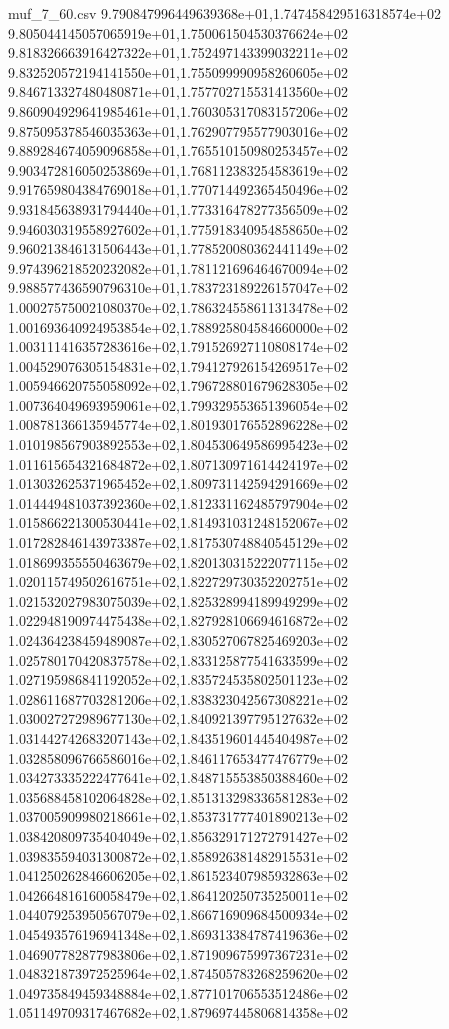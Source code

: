 \begin{filecontents*}{muf_7_60.csv}
9.790847996449639368e+01,1.747458429516318574e+02
9.805044145057065919e+01,1.750061504530376624e+02
9.818326663916427322e+01,1.752497143399032211e+02
9.832520572194141550e+01,1.755099990958260605e+02
9.846713327480480871e+01,1.757702715531413560e+02
9.860904929641985461e+01,1.760305317083157206e+02
9.875095378546035363e+01,1.762907795577903016e+02
9.889284674059096858e+01,1.765510150980253457e+02
9.903472816050253869e+01,1.768112383254583619e+02
9.917659804384769018e+01,1.770714492365450496e+02
9.931845638931794440e+01,1.773316478277356509e+02
9.946030319558927602e+01,1.775918340954858650e+02
9.960213846131506443e+01,1.778520080362441149e+02
9.974396218520232082e+01,1.781121696464670094e+02
9.988577436590796310e+01,1.783723189226157047e+02
1.000275750021080370e+02,1.786324558611313478e+02
1.001693640924953854e+02,1.788925804584660000e+02
1.003111416357283616e+02,1.791526927110808174e+02
1.004529076305154831e+02,1.794127926154269517e+02
1.005946620755058092e+02,1.796728801679628305e+02
1.007364049693959061e+02,1.799329553651396054e+02
1.008781366135945774e+02,1.801930176552896228e+02
1.010198567903892553e+02,1.804530649586995423e+02
1.011615654321684872e+02,1.807130971614424197e+02
1.013032625371965452e+02,1.809731142594291669e+02
1.014449481037392360e+02,1.812331162485797904e+02
1.015866221300530441e+02,1.814931031248152067e+02
1.017282846143973387e+02,1.817530748840545129e+02
1.018699355550463679e+02,1.820130315222077115e+02
1.020115749502616751e+02,1.822729730352202751e+02
1.021532027983075039e+02,1.825328994189949299e+02
1.022948190974475438e+02,1.827928106694616872e+02
1.024364238459489087e+02,1.830527067825469203e+02
1.025780170420837578e+02,1.833125877541633599e+02
1.027195986841192052e+02,1.835724535802501123e+02
1.028611687703281206e+02,1.838323042567308221e+02
1.030027272989677130e+02,1.840921397795127632e+02
1.031442742683207143e+02,1.843519601445404987e+02
1.032858096766586016e+02,1.846117653477476779e+02
1.034273335222477641e+02,1.848715553850388460e+02
1.035688458102064828e+02,1.851313298336581283e+02
1.037005909980218661e+02,1.853731777401890213e+02
1.038420809735404049e+02,1.856329171272791427e+02
1.039835594031300872e+02,1.858926381482915531e+02
1.041250262846606205e+02,1.861523407985932863e+02
1.042664816160058479e+02,1.864120250735250011e+02
1.044079253950567079e+02,1.866716909684500934e+02
1.045493576196941348e+02,1.869313384787419636e+02
1.046907782877983806e+02,1.871909675997367231e+02
1.048321873972525964e+02,1.874505783268259620e+02
1.049735849459348884e+02,1.877101706553512486e+02
1.051149709317467682e+02,1.879697445806814358e+02

\end{filecontents*}
